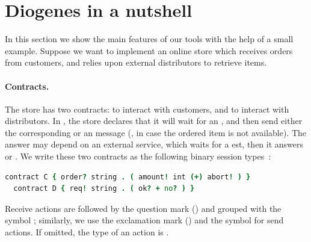 \section{Diogenes in a nutshell}

In this section we show the main features of our tools
with the help of a small example.
Suppose we want to implement an online store which 
receives orders from customers,
and relies upon external distributors to retrieve items.

\paragraph{Contracts.}
The store has two contracts:
 to interact with customers, and
 to interact with distributors.
In , the store declares that it will wait for an ,
and then send either the corresponding  or an  message
(\eg, in case the ordered item is not available).
The answer may depend on an external service, 
which waits for a est, then it answers  or .
% 
We write these two contracts as the following 
binary session types~\cite{Honda98esop}:
% 
\begin{lstlisting}[language=coco,basicstyle=\scriptsize\ttfamily]
  contract C { order? string . ( amount! int (+) abort! ) }
  contract D { req! string . ( ok? + no? ) }
\end{lstlisting}
Receive actions are followed by the question mark () and grouped
with the symbol \code{+}; similarly, we use the
exclamation mark (\code{!}) and the symbol \code{(+)} for
send actions. If omitted, the type of an action is .



